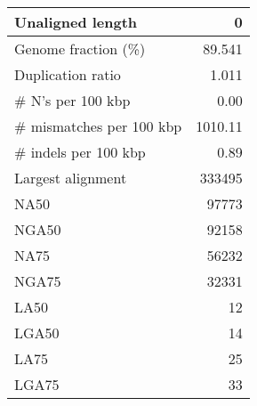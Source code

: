 \documentclass[12pt,a4paper]{article}
\begin{document}
\begin{table}[ht]
\begin{center}
\begin{tabular}{|l*{1}{|r}|}
Unaligned length & 0 \\ \hline
Genome fraction (\%) & 89.541 \\ \hline
Duplication ratio & 1.011 \\ \hline
\# N's per 100 kbp & 0.00 \\ \hline
\# mismatches per 100 kbp & 1010.11 \\ \hline
\# indels per 100 kbp & 0.89 \\ \hline
Largest alignment & 333495 \\ \hline
NA50 & 97773 \\ \hline
NGA50 & 92158 \\ \hline
NA75 & 56232 \\ \hline
NGA75 & 32331 \\ \hline
LA50 & 12 \\ \hline
LGA50 & 14 \\ \hline
LA75 & 25 \\ \hline
LGA75 & 33 \\ \hline
\end{tabular}
\end{center}
\end{table}
\end{document}

